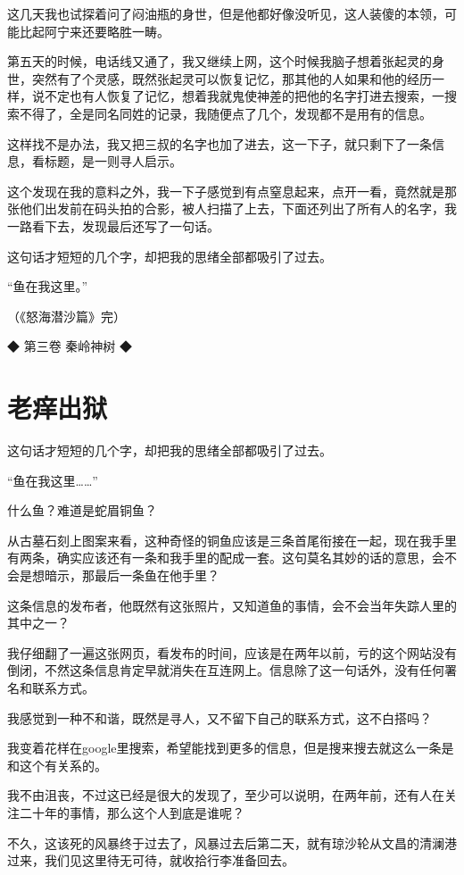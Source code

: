 这几天我也试探着问了闷油瓶的身世，但是他都好像没听见，这人装傻的本领，可能比起阿宁来还要略胜一畴。

第五天的时候，电话线又通了，我又继续上网，这个时候我脑子想着张起灵的身世，突然有了个灵感，既然张起灵可以恢复记忆，那其他的人如果和他的经历一样，说不定也有人恢复了记忆，想着我就鬼使神差的把他的名字打进去搜索，一搜索不得了，全是同名同姓的记录，我随便点了几个，发现都不是用有的信息。

这样找不是办法，我又把三叔的名字也加了进去，这一下子，就只剩下了一条信息，看标题，是一则寻人启示。

这个发现在我的意料之外，我一下子感觉到有点窒息起来，点开一看，竟然就是那张他们出发前在码头拍的合影，被人扫描了上去，下面还列出了所有人的名字，我一路看下去，发现最后还写了一句话。

这句话才短短的几个字，却把我的思绪全部都吸引了过去。

“鱼在我这里。”

（《怒海潜沙篇》完）

◆ 第三卷 秦岭神树 ◆

\chapter{老痒出狱}

这句话才短短的几个字，却把我的思绪全部都吸引了过去。

“鱼在我这里……”

什么鱼？难道是蛇眉铜鱼？

从古墓石刻上图案来看，这种奇怪的铜鱼应该是三条首尾衔接在一起，现在我手里有两条，确实应该还有一条和我手里的配成一套。这句莫名其妙的话的意思，会不会是想暗示，那最后一条鱼在他手里？

这条信息的发布者，他既然有这张照片，又知道鱼的事情，会不会当年失踪人里的其中之一？

我仔细翻了一遍这张网页，看发布的时间，应该是在两年以前，亏的这个网站没有倒闭，不然这条信息肯定早就消失在互连网上。信息除了这一句话外，没有任何署名和联系方式。

我感觉到一种不和谐，既然是寻人，又不留下自己的联系方式，这不白搭吗？

我变着花样在google里搜索，希望能找到更多的信息，但是搜来搜去就这么一条是和这个有关系的。

我不由沮丧，不过这已经是很大的发现了，至少可以说明，在两年前，还有人在关注二十年的事情，那么这个人到底是谁呢？

不久，这该死的风暴终于过去了，风暴过去后第二天，就有琼沙轮从文昌的清澜港过来，我们见这里待无可待，就收拾行李准备回去。

